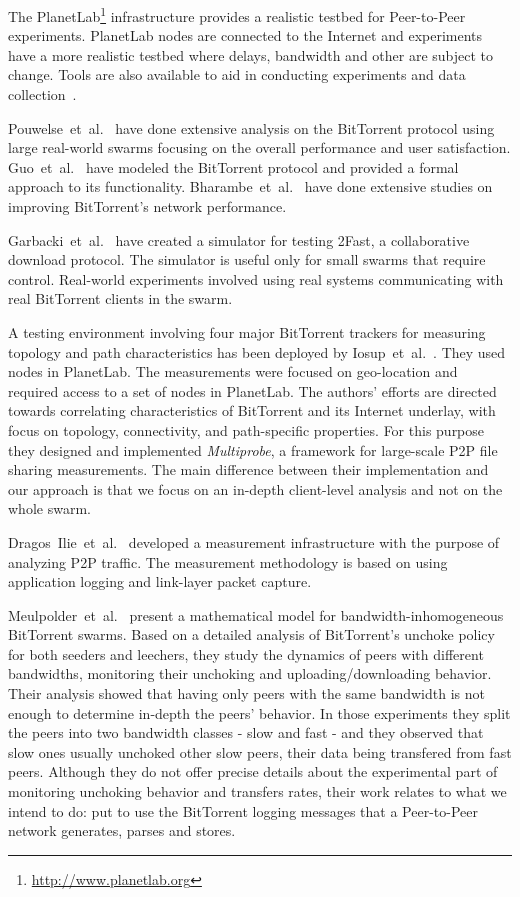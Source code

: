 The PlanetLab\footnote{\url{http://www.planetlab.org}} infrastructure provides a
realistic testbed for Peer-to-Peer experiments. PlanetLab nodes are connected
to the Internet and experiments have a more realistic testbed where delays,
bandwidth and other are subject to change. Tools are also available to aid in
conducting experiments and data collection~\cite{bittorrent-planetlab}.

Pouwelse~et~al.~\cite{measurement-study} have done extensive analysis on the
BitTorrent protocol using large real-world swarms focusing on the overall
performance and user satisfaction. Guo~et~al.~\cite{guo} have modeled the
BitTorrent protocol and provided a formal approach to its functionality.
Bharambe~et~al.~\cite{bt-analysis} have done extensive studies on improving
BitTorrent's network performance.

Garbacki~et~al.~\cite{garbacki} have created a simulator for testing 2Fast, a
collaborative download protocol. The simulator is useful only for small swarms
that require control. Real-world experiments involved using real systems
communicating with real BitTorrent clients in the swarm.

A testing environment involving four major BitTorrent trackers for measuring
topology and path characteristics has been deployed by
Iosup~et~al.~\cite{corr-overlay}. They used nodes in PlanetLab. The
measurements were focused on geo-location and required access to a set of
nodes in PlanetLab. The authors' efforts are directed towards correlating
characteristics of BitTorrent and its Internet underlay, with focus on
topology, connectivity, and path-specific properties. For this purpose they
designed and implemented \textit{Multiprobe}, a framework for large-scale P2P
file sharing measurements. The main difference between their implementation
and our approach is that we focus on an in-depth client-level analysis and not
on the whole swarm.

Dragos~Ilie~et~al.~\cite{p2p-traf-meas} developed a measurement infrastructure
with the purpose of analyzing P2P traffic. The measurement methodology is
based on using application logging and link-layer packet capture.

Meulpolder~et~al.~\cite{p2p09} present a mathematical model for
bandwidth-inhomogeneous BitTorrent swarms. Based on a detailed analysis of
BitTorrent's unchoke policy for both seeders and leechers, they study the
dynamics of peers with different bandwidths, monitoring their unchoking and
uploading/downloading behavior. Their analysis showed that having only peers
with the same bandwidth is not enough to determine in-depth the peers'
behavior. In those experiments they split the peers into two bandwidth classes
- slow and fast - and they observed that slow ones usually unchoked other slow
peers, their data being transfered from fast peers. Although they do not offer
precise details about the experimental part of monitoring unchoking behavior
and transfers rates, their work relates to what we intend to do: put to use
the BitTorrent logging messages that a Peer-to-Peer network generates, parses
and stores.


